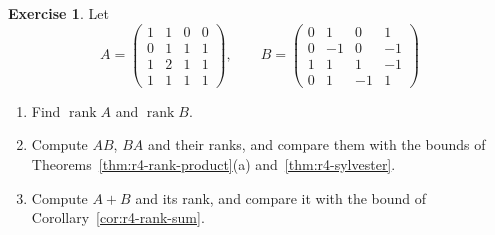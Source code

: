 \documentclass[12pt]{article}
\DeclareMathOperator{\rank}{rank}
\theoremstyle{definition}
\newtheorem{exercise}{Exercise}
\begin{document}
\begin{exercise}\label{r4-dr-product-sum}
Let
\[
A=\begin{pmatrix}1&1&0&0\\0&1&1&1\\1&2&1&1\\1&1&1&1\end{pmatrix},\qquad
B=\begin{pmatrix}0&1&0&1\\0&-1&0&-1\\1&1&1&-1\\0&1&-1&1\end{pmatrix}
\]
\begin{enumerate}
\item Find \(\rank A\) and \(\rank B\).
\item Compute \(AB\), \(BA\) and their ranks, and compare them with the bounds of
Theorems~\ref{thm:r4-rank-product}(a) and~\ref{thm:r4-sylvester}.
\item Compute \(A+B\) and its rank, and compare it with the bound of Corollary~\ref{cor:r4-rank-sum}.
\end{enumerate}
\end{exercise}
\end{document}
